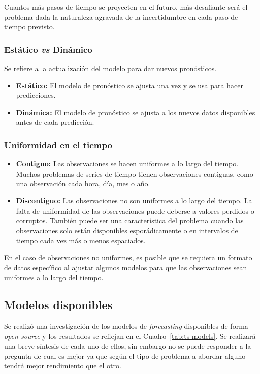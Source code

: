 \documentclass[a4paper,12pt]{article}
\begin{document}
Cuantos más pasos de tiempo se proyecten en el futuro, más desafiante será el problema dada la naturaleza agravada de la incertidumbre en cada paso de tiempo previsto.

\subsubsection{Estático \textit{vs} Dinámico}
Se refiere a la actualización del modelo para dar nuevos pronósticos.
\begin{itemize}[noitemsep, topsep=2pt]
	\item \textbf{Estático:} El modelo de pronóstico se ajusta una vez y se usa para hacer predicciones.
	\item \textbf{Dinámica:} El modelo de pronóstico se ajusta a los nuevos datos disponibles antes de cada predicción.
\end{itemize}

\subsubsection{Uniformidad en el tiempo}
\begin{itemize}[noitemsep, topsep=2pt]
	\item \textbf{Contiguo:} Las observaciones se hacen uniformes a lo largo del tiempo. Muchos problemas de series de tiempo tienen observaciones contiguas, como una observación cada hora, día, mes o año.
	\item \textbf{Discontiguo:} Las observaciones no son uniformes a lo largo del tiempo. La falta de uniformidad de las observaciones puede deberse a valores perdidos o corruptos. También puede ser una característica del problema cuando las observaciones solo están disponibles esporádicamente o en intervalos de tiempo cada vez más o menos espaciados.
\end{itemize}

En el caso de observaciones no uniformes, es posible que se requiera un formato de datos específico al ajustar algunos modelos para que las observaciones sean uniformes a lo largo del tiempo.

\subsection{Modelos disponibles}

Se realizó una investigación de los modelos de \textit{forecasting} disponibles de forma \textit{open-source} y los resultados se reflejan en el Cuadro~\ref{tab:ts-models}. Se realizará una breve síntesis de cada uno de ellos, sin embargo no se puede responder a la pregunta de cual es mejor ya que según el tipo de problema a abordar alguno tendrá mejor rendimiento que el otro.
\end{document}
